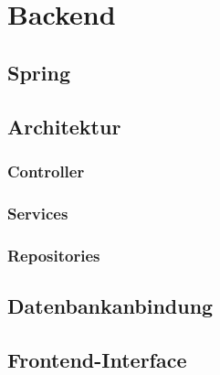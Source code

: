 \section{Backend}

\subsection{Spring}

\subsection{Architektur}

\subsubsection{Controller}

\subsubsection{Services}

\subsubsection{Repositories}

\subsection{Datenbankanbindung}

\subsection{Frontend-Interface}